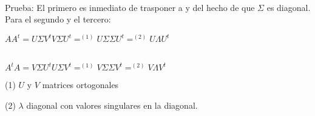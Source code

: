 \ \\
Prueba: El primero es inmediato de trasponer a y del hecho de que $\Sigma$ es diagonal. Para el
segundo y el tercero:
\begin{center}
$A A^t = U \Sigma V^t V \Sigma U^t =^{(1)} U \Sigma \Sigma U^t =^{(2)} U \Lambda U^t$

\ \\
$A^t A = V \Sigma U^t U \Sigma V^t =^{(1)} V \Sigma \Sigma V^t =^{(2)} V \Lambda V^t$
\end{center}

(1) $U$ y $V$ matrices ortogonales

(2) $\lambda$ diagonal con valores singulares en la diagonal.
